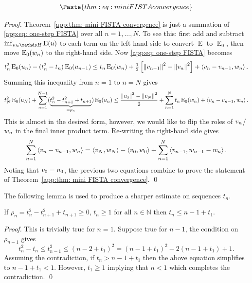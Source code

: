 \documentclass[smallextended]{svjour3}
\let\F\mathds\let\C\mathcal\newcommand{\R}{\F{R}}\newcommand{\A}{\tens{A}}
\newcommand{\norm}[1]{{\left\lVert #1 \right\rVert}}
\newcommand{\IP}[2]{\left\langle #1,#2 \right\rangle}
\newcommand{\op}[1]{\operatorname{#1}}
\newcommand{\1}{\F{1}}
\newcommand{\Emin}[1][\var0]{\inf_{#1\in\F H}\op{E}(#1)}
\newcommand*{\var}[1]{%
	\IfEqCase{#1}{%
		{0}{u}%
		{1}{v}%
		{2}{w}%
	}[u#1]%
}
\begin{document}
	
	
	\begin{theorem}\label{app:thm: mini FISTA convergence}
		\begin{equation}\label{app:eq: FISTA inequality}
			\Paste{thm:eq: mini FISTA convergence}
		\end{equation}
	\end{theorem}
	\begin{proof}
		Theorem~\ref{app:thm: mini FISTA convergence} is just a summation of \eqref{app:eq: one-step FISTA} over all $n=1,\ldots,N$. To see this: first add and subtract $\Emin$ to each term on the left-hand side to convert $\op{E}$ to $\op{E}_0$, then move $\op{E}_0(\var2_n)$ to the right-hand side. Now \eqref{app:eq: one-step FISTA} becomes
		\begin{equation}
			t_n^2\op{E}_0(\var0_n) - (t_n^2-t_n)\op{E}_0(\var0_{n-1}) \leq t_n\op{E}_0(\var2_n) + \tfrac1{2}\left[\norm{\var1_{n-1}}^2-\norm{\var1_n}^2\right] + \IP{\var1_n-\var1_{n-1}}{\var2_n}. 
		\end{equation}
		Summing this inequality from $n=1$ to $n=N$ gives
		\begin{equation}
			t_N^2\op{E}_0(\var0_N) + \sum_{n=1}^{N-1}(\underbrace{t_n^2-t_{n+1}^2+t_{n+1}}_{=\rho_n})\op{E}_0(\var0_n) \leq \frac{\norm{\var1_0}^2-\norm{\var1_N}^2}{2} + \sum_{n=1}^N t_n\op{E}_0(\var2_n)+\IP{\var1_n-\var1_{n-1}}{\var2_n}.
		\end{equation}
		This is almost in the desired form, however, we would like to flip the roles of $\var1_n$/$\var2_n$ in the final inner product term. Re-writing the right-hand side gives
		\begin{equation}
			\sum_{n=1}^N\IP{\var1_n-\var1_{n-1}}{\var2_n} = \IP{\var1_N}{\var2_N} - \IP{\var1_0}{\var2_0}+ \sum_{n=1}^N\IP{\var1_{n-1}}{\var2_{n-1}-\var2_n}.
		\end{equation}
		Noting that $\var1_0=\var0_0$, the previous two equations combine to prove the statement of Theorem~\ref{app:thm: mini FISTA convergence}.
		\qed\end{proof}
	
	The following lemma is used to produce a sharper estimate on sequences $t_n$.
	\begin{lemma}\label{app: tn upper bound}
		If $\rho_n=t_{n}^2-t_{n+1}^2+t_{n+1}\geq0$, $t_n\geq 1$ for all $n\in\F N$ then $t_n\leq n-1 +t_1$.
	\end{lemma}
	\begin{proof}
		This is trivially true for $n=1$. Suppose true for $n-1$, the condition on $\rho_{n-1}$ gives
		\begin{equation}
			t_n^2 -t_n \leq t_{n-1}^2 \leq (n-2+t_1)^2 = (n-1+t_1)^2 -2(n-1+t_1) + 1.
		\end{equation}
		Assuming the contradiction, if $t_n> n-1+t_1$ then the above equation simplifies to $n-1+t_1 < 1$. However, $t_1\geq 1$ implying that $n<1$ which completes the contradiction.
		\qed\end{proof}
	
\end{document}
